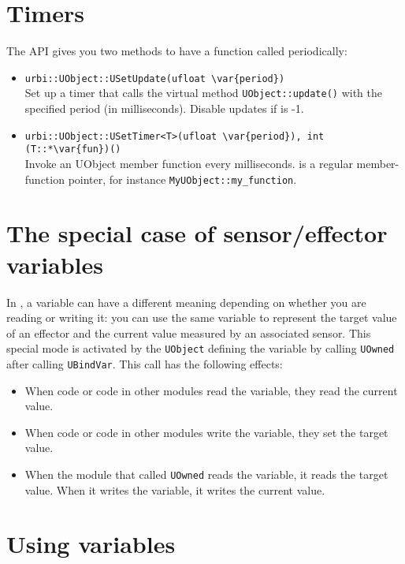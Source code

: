 \section{Timers}
\label{sec:uob:timers}

The API gives you two methods to have a function called periodically:
\begin{itemize}
\item \lstinline|urbi::UObject::USetUpdate(ufloat \var{period})|\\
  Set up a timer that calls the virtual method
  \lstinline{UObject::update()} with the specified period (in
  milliseconds).  Disable updates if  is -1.

\item \lstinline|urbi::UObject::USetTimer<T>(ufloat \var{period}), int (T::*\var{fun})()|\\
  Invoke an UObject member function  every 
  milliseconds.   is a regular member-function pointer, for
  instance \lstinline|MyUObject::my_function|.
\end{itemize}

\section{The special case of sensor/effector variables}

In \urbi, a variable can have a different meaning depending on whether
you are reading or writing it: you can use the same variable to
represent the target value of an effector and the current value
measured by an associated sensor. This special mode is activated by
the \lstinline{UObject} defining the variable by calling
\lstinline{UOwned} after calling \lstinline{UBindVar}. This call has
the following effects:
\begin{itemize}
\item When \urbi code or code in other modules read the variable, they
  read the current value.
\item When \urbi code or code in other modules write the variable,
  they set the target value.
\item When the module that called \lstinline|UOwned| reads the
  variable, it reads the target value. When it writes the variable, it
  writes the current value.
\end{itemize}

\section{Using \urbi variables}

